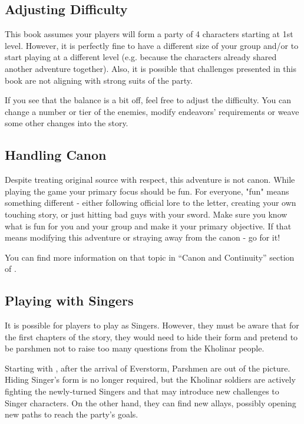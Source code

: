 \subsection{Adjusting Difficulty}

This book assumes your players will form a party of 4 characters starting at 1st level. However, it is perfectly fine to have a different size of your group and/or to start playing at a different level (e.g. because the characters already shared another adventure together). Also, it is possible that challenges presented in this book are not aligning with strong suits of the party.

If you see that the balance is a bit off, feel free to adjust the difficulty. You can change a number or tier of the enemies, modify endeavors' requirements or weave some other changes into the story.



\subsection{Handling Canon}
\label{ssec:runningAdventureCanon}

Despite treating original source with respect, this adventure is not canon. While playing the game your primary focus should be fun. For everyone, "fun" means something different - either following official lore to the letter, creating your own touching story, or just hitting bad guys with your sword. Make sure you know what is fun for you and your group and make it your primary objective. If that means modifying this adventure or straying away from the canon - go for it!

You can find more information on that topic in “Canon and Continuity” section of \handbook{}.




\subsection{Playing with Singers}

It is possible for players to play as Singers. However, they must be aware that for the first chapters of the story, they would need to hide their form and pretend to be parshmen not to raise too many questions from the Kholinar people.

Starting with , after the arrival of Everstorm, Parshmen are out of the picture. Hiding Singer's form is no longer required, but the Kholinar soldiers are actively fighting the newly-turned Singers and that may introduce new challenges to Singer characters. On the other hand, they can find new allays, possibly opening new paths to reach the party's goals.



